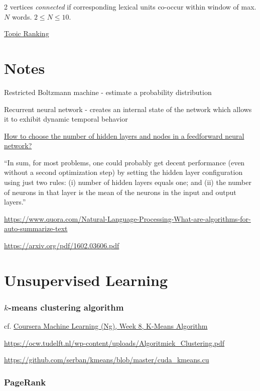 \documentclass[10pt]{amsart}
\begin{document}
\begin{multicols*}{2}
2 vertices \emph{connected} if corresponding lexical units co-occur within window of max. $N$ words.  $2\leq N \leq 10$.  

\href{http://www.aclweb.org/anthology/I13-1062}{Topic Ranking}




\part{Notes}


Restricted Boltzmann machine - estimate a probability distribution

Recurrent neural network - creates an internal state of the network which allows it to exhibit dynamic temporal behavior


\href{http://stats.stackexchange.com/questions/181/how-to-choose-the-number-of-hidden-layers-and-nodes-in-a-feedforward-neural-netw}{How to choose the number of hidden layers and nodes in a feedforward neural network?}

``In sum, for most problems, one could probably get decent performance (even without a second optimization step) by setting the hidden layer configuration using just two rules: (i) number of hidden layers equals one; and (ii) the number of neurons in that layer is the mean of the neurons in the input and output layers.''


\url{https://www.quora.com/Natural-Language-Processing-What-are-algorithms-for-auto-summarize-text}

\url{https://arxiv.org/pdf/1602.03606.pdf}


\part{Unsupervised Learning}

\section{$k$-means clustering algorithm}

cf. \href{https://www.coursera.org/learn/machine-learning/lecture/93VPG/k-means-algorithm}{Coursera Machine Learning (Ng), Week 8, K-Means Algorithm}

\url{https://ocw.tudelft.nl/wp-content/uploads/Algoritmiek_Clustering.pdf}

\url{https://github.com/serban/kmeans/blob/master/cuda_kmeans.cu}

\section{PageRank}  


\end{multicols*}
\end{document}
